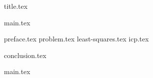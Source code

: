 



{title.tex}

\clearpage
{}
{main.tex}

\tableofcontents

\clearpage
{}
\pagestyle{fancy}
\setcounter{page}{8}

\clearpage

{preface.tex}
{problem.tex}
{least-squares.tex}
{icp.tex}

{conclusion.tex}

\clearpage
{}
{}
\renewcommand\bibname{Перелік посилань}


{main.tex}


